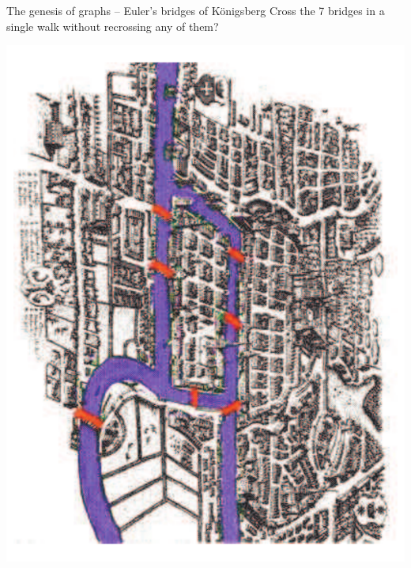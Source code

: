 \documentclass[aspectratio=169]{beamer}\usepackage[]{graphicx}\usepackage[]{xcolor}
\begin{document}
\begin{frame}{The genesis of graphs -- Euler's bridges of K\"onigsberg}
	Cross the 7 bridges in a single walk without recrossing any of them?
	\begin{center}
	\includegraphics[angle=90,height=.75\textheight]{FIGS/bridge_color}
	\end{center}
\end{frame}
\end{document}

